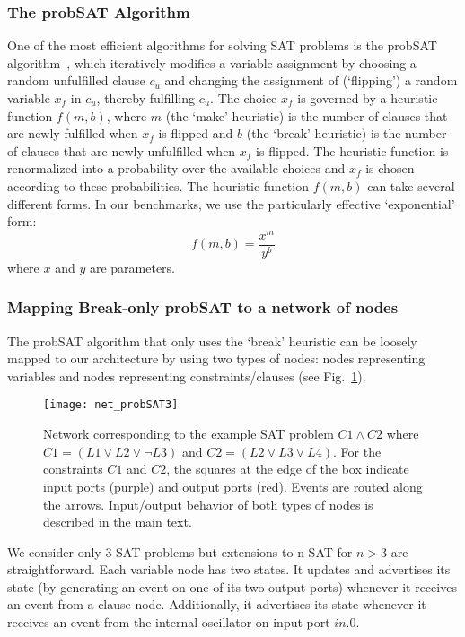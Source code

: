\documentclass[10pt]{article}
\begin{document}
\subsubsection*{The probSAT Algorithm}
One of the most efficient algorithms for solving SAT problems is the probSAT algorithm~\cite{Balint_Schoning12}, which iteratively modifies a variable assignment by choosing a random unfulfilled clause $c_u$ and changing the assignment of (`flipping') a random variable $x_f$ in $c_u$, thereby fulfilling $c_u$. The choice $x_f$ is governed by a heuristic function $f(m,b)$, where $m$ (the `make' heuristic) is the number of clauses that are newly fulfilled when $x_f$ is flipped and $b$ (the `break' heuristic) is the number of clauses that are newly unfulfilled when $x_f$ is flipped. The heuristic function is renormalized into a probability over the available choices and $x_f$ is chosen according to these probabilities.
The heuristic function $f(m,b)$ can take several different forms. In our benchmarks, we use the particularly effective `exponential' form:
\begin{equation}
f(m,b) = \frac{x^m}{y^b}
\end{equation}
where $x$ and $y$ are parameters. 


\subsubsection*{Mapping Break-only probSAT to a network of nodes}
The probSAT algorithm that only uses the `break' heuristic can be loosely mapped to our architecture by using two types of nodes: nodes representing variables and nodes representing constraints/clauses (see Fig.~\ref{fig:net_spa}).
\begin{figure}
  \centering
     \texttt{[image: net\_probSAT3]} 
     \caption{Network corresponding to the example SAT problem $C1 \wedge C2$ where $C1 = (L1 \vee L2 \vee \neg L3)$ and $C2 = (L2 \vee L3 \vee L4)$. For the constraints $C1$ and $C2$, the squares at the edge of the box indicate input ports (purple) and output ports (red). Events are routed along the arrows. Input/output behavior of both types of nodes is described in the main text.}
\label{fig:net_spa}
\end{figure}	
We consider only 3-SAT problems but extensions to n-SAT for $n > 3$ are straightforward. Each variable node has two states. It updates and advertises its state (by generating an event on one of its two output ports) whenever it receives an event from a clause node. Additionally, it advertises its state whenever it receives an event from the internal oscillator on input port $in.0$. 
\end{document}
